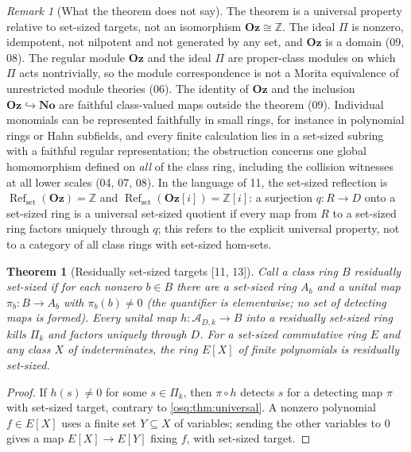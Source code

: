 \documentclass[11pt,letterpaper]{article}
\numberwithin{equation}{section}
\newtheorem{theorem}{Theorem}[section]
\theoremstyle{definition}
\theoremstyle{remark}
\newtheorem{remark}[remark]{Remark}
\theoremstyle{plain}
\newcommand{\No}{\mathbf{No}}
\newcommand{\Oz}{\mathbf{Oz}}
\newcommand{\GOz}{\Oz[i]}
\newcommand{\Z}{\mathbb Z}
\newcommand{\A}{\mathcal A}          %
\newcommand{\Refset}{\operatorname{Ref}_{\mathrm{set}}}
\newcommand{\src}[1]{\textup{\textsf{[#1]}}}
\begin{document}
\begin{remark}[What the theorem does not say]\label{osq:rem:notsay}
The theorem is a universal property relative to set-sized targets, not an isomorphism
$\Oz\cong\Z$. The ideal $\Pi$ is nonzero, idempotent, not nilpotent and not generated by
any set, and $\Oz$ is a domain (09, 08). The regular module $\Oz$ and the ideal $\Pi$ are
proper-class modules on which $\Pi$ acts nontrivially, so the module correspondence is not
a Morita equivalence of unrestricted module theories (06). The identity of $\Oz$ and the
inclusion $\Oz\hookrightarrow\No$ are faithful class-valued maps outside the theorem (09).
Individual monomials can be represented faithfully in small rings, for instance in
polynomial rings or Hahn subfields, and every finite calculation lies in a set-sized
subring with a faithful regular representation; the obstruction concerns one global
homomorphism defined on \emph{all} of the class ring, including the collision witnesses at
all lower scales (04, 07, 08). In the language of 11, the set-sized reflection is
$\Refset(\Oz)=\Z$ and $\Refset(\GOz)=\Z[i]$: a surjection $q:R\to D$ onto a set-sized ring
is a universal set-sized quotient if every map from $R$ to a set-sized ring factors uniquely
through $q$; this refers to the explicit universal property, not to a category of all class
rings with set-sized hom-sets.
\end{remark}

\begin{theorem}[Residually set-sized targets \src{11, 13}]\label{osq:thm:residual}
Call a class ring $B$ \emph{residually set-sized} if for each nonzero $b\in B$ there are a
set-sized ring $A_b$ and a unital map $\pi_b:B\to A_b$ with $\pi_b(b)\ne0$ (the quantifier
is elementwise; no set of detecting maps is formed). Every unital map $h:\A_{D,k}\to B$
into a residually set-sized ring kills $\Pi_k$ and factors uniquely through $D$. For a
set-sized commutative ring $E$ and any class $X$ of indeterminates, the ring $E[X]$ of
finite polynomials is residually set-sized.
\end{theorem}
\begin{proof}
If $h(s)\ne0$ for some $s\in\Pi_k$, then $\pi\circ h$ detects $s$ for a detecting map
$\pi$ with set-sized target, contrary to \cref{osq:thm:universal}. A nonzero polynomial
$f\in E[X]$ uses a finite set $Y\subseteq X$ of variables; sending the other variables to
$0$ gives a map $E[X]\to E[Y]$ fixing $f$, with set-sized target.
\end{proof}
\end{document}
